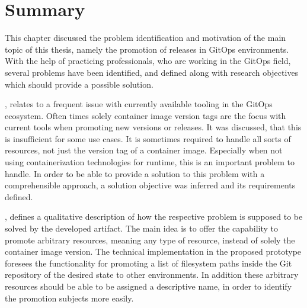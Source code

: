 %
%
















\section{Summary}

This chapter discussed the problem identification and motivation of the main topic of this thesis,
namely the promotion of releases in GitOps environments.
With the help of practicing professionals, who are working in the GitOps field,
several problems have been identified,
and defined along with research objectives which should provide a possible solution.

,
relates to a frequent issue with currently available tooling in the GitOps ecosystem. 
Often times solely container image version tags are the focus with current tools when promoting
new versions or releases. It was discussed, that this is insufficient for some use cases.
It is sometimes required to handle all sorts of resources, not just the version tag of a container image.
Especially when not using containerization technologies for runtime, this is an important problem to handle.
In order to be able to provide a solution to this problem with a comprehensible approach,
a solution objective was inferred and its requirements defined.

,
defines a qualitative description of how the respective problem is supposed to be solved
by the developed artifact. The main idea is to offer the capability to promote arbitrary resources,
meaning any type of resource, instead of solely the container image version.
The technical implementation in the proposed prototype foresees the functionality for
promoting a list of filesystem paths inside the Git repository of the desired state to other environments.
In addition these arbitrary resources should be able to be assigned a descriptive name,
in order to identify the promotion subjects more easily.

